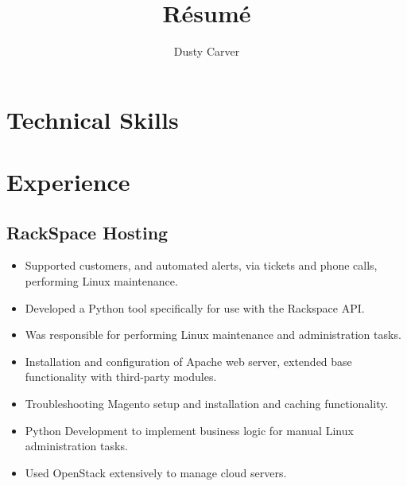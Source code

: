 \documentclass{article}
\begin{document}
\title{R\'esum\'e}
\author{Dusty Carver}

\maketitle

\section{Technical Skills}

\section{Experience}

\subsection{RackSpace Hosting}
\begin{itemize}
\item{Supported customers, and automated alerts, via tickets and phone calls, performing Linux maintenance.}
\item{Developed a Python tool specifically for use with the Rackspace API.}
\item{Was responsible for performing Linux maintenance and administration tasks.}
\item{Installation and configuration of Apache web server, extended base functionality with third-party modules.}
\item{Troubleshooting Magento setup and installation and caching functionality.}
\item{Python Development to implement business logic for manual Linux administration tasks.}
\item{Used OpenStack extensively to manage cloud servers.}
\end{itemize}
\end{document}
